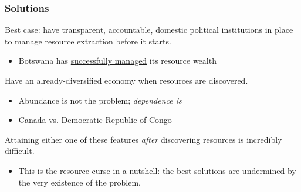 \documentclass{beamer}
\begin{document}
\begin{frame} 
	\frametitle{\LARGE{Solutions}}
	\begin{itemize}
		\large{
			\item Best case: have transparent, accountable, domestic political institutions in place to manage resource extraction before it starts. \pause
			\begin{itemize}
				\item Botswana has \href{https://openknowledge.worldbank.org/handle/10986/18304}{successfully managed} its resource wealth\pause
			\end{itemize}
			
			\item Have an already-diversified economy when resources are discovered. \pause
			\begin{itemize}
				\item Abundance is not the problem; \textit{dependence is} \pause
				\item Canada vs. Democratic Republic of Congo\pause
			\end{itemize}
			
			\item Attaining either one of these features \textit{after} discovering resources is incredibly difficult. \pause
			\begin{itemize}
				\item This is the resource curse in a nutshell: the best solutions are undermined by the very existence of the problem. 
			\end{itemize}
		}
	\end{itemize}
\end{frame}
\end{document}
